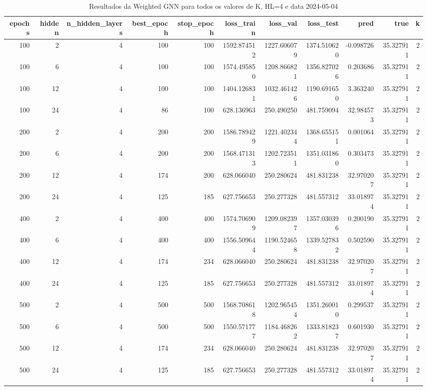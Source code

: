 \begin{table}
\caption{Resultados da Weighted GNN para todos os valores de K, HL=4 e data 2024-05-04}
\label{tab:weighted_gnn_results_allk_hl4_d20240504}
\begin{tabular}{rrrrrrrrrrr}
\toprule
epochs & hidden & n\_hidden\_layers & best\_epoch & stop\_epoch & loss\_train & loss\_val & loss\_test & pred & true & k \\
\midrule
100 & 2 & 4 & 100 & 100 & 1592.874512 & 1227.606079 & 1374.510620 & -0.098726 & 35.327911 & 2 \\
100 & 6 & 4 & 100 & 100 & 1574.495850 & 1208.866821 & 1356.827026 & 0.203686 & 35.327911 & 2 \\
100 & 12 & 4 & 100 & 100 & 1404.126831 & 1032.461426 & 1190.691650 & 3.363240 & 35.327911 & 2 \\
100 & 24 & 4 & 86 & 100 & 628.136963 & 250.490250 & 481.759094 & 32.984573 & 35.327911 & 2 \\
200 & 2 & 4 & 200 & 200 & 1586.789429 & 1221.402344 & 1368.655151 & 0.001064 & 35.327911 & 2 \\
200 & 6 & 4 & 200 & 200 & 1568.471313 & 1202.723511 & 1351.031860 & 0.303473 & 35.327911 & 2 \\
200 & 12 & 4 & 174 & 200 & 628.066040 & 250.280624 & 481.831238 & 32.970207 & 35.327911 & 2 \\
200 & 24 & 4 & 125 & 185 & 627.756653 & 250.277328 & 481.557312 & 33.018974 & 35.327911 & 2 \\
400 & 2 & 4 & 400 & 400 & 1574.706909 & 1209.082397 & 1357.030396 & 0.200190 & 35.327911 & 2 \\
400 & 6 & 4 & 400 & 400 & 1556.509644 & 1190.524658 & 1339.527832 & 0.502590 & 35.327911 & 2 \\
400 & 12 & 4 & 174 & 234 & 628.066040 & 250.280624 & 481.831238 & 32.970207 & 35.327911 & 2 \\
400 & 24 & 4 & 125 & 185 & 627.756653 & 250.277328 & 481.557312 & 33.018974 & 35.327911 & 2 \\
500 & 2 & 4 & 500 & 500 & 1568.708618 & 1202.965454 & 1351.260010 & 0.299537 & 35.327911 & 2 \\
500 & 6 & 4 & 500 & 500 & 1550.571777 & 1184.468262 & 1333.818237 & 0.601930 & 35.327911 & 2 \\
500 & 12 & 4 & 174 & 234 & 628.066040 & 250.280624 & 481.831238 & 32.970207 & 35.327911 & 2 \\
500 & 24 & 4 & 125 & 185 & 627.756653 & 250.277328 & 481.557312 & 33.018974 & 35.327911 & 2 \\

\end{tabular}
\end{table}
